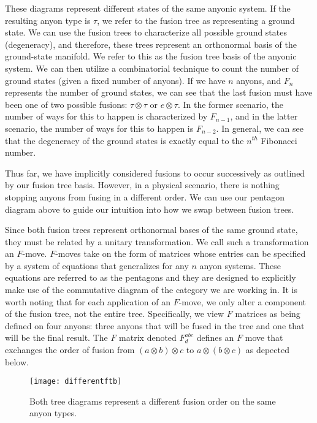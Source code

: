 These diagrams represent different states of the same anyonic system. If the resulting anyon type is $\tau$, we refer to the fusion tree as representing a ground state. We can use the fusion trees to characterize all possible ground states (degeneracy), and therefore, these trees represent an orthonormal basis of the ground-state manifold\cite{Trebst}. We refer to this as the fusion tree basis of the anyonic system. We can then utilize a combinatorial technique to count the number of ground states (given a fixed number of anyons). If we have $n$ anyons, and $F_n$ represents the number of ground states, we can see that the last fusion must have been one of two possible fusions: $\tau\otimes \tau$ or $e \otimes \tau$. In the former scenario, the number of ways for this to happen is characterized by $F_{n-1}$, and in the latter scenario, the number of ways for this to happen is $F_{n-2}$. In general, we can see that the degeneracy of the ground states is exactly equal to the $n^{th}$ Fibonacci number.

Thus far, we have implicitly considered fusions to occur successively as outlined by our fusion tree basis. However, in a physical scenario, there is nothing stopping anyons from fusing in a different order. We can use our pentagon diagram above to guide our intuition into how we swap between fusion trees.

Since both fusion trees represent orthonormal bases of the same ground state, they must be related by a unitary transformation. We call such a transformation an $F$-move. $F$-moves take on the form of matrices whose entries can be specified by a system of equations that generalizes for any $n$ anyon systems. These equations are referred to as the pentagons and they are designed to explicitly make use of the commutative diagram of the category we are working in. It is worth noting that for each application of an $F$-move, we only alter a component of the fusion tree, not the entire tree. Specifically, we view $F$ matrices as being defined on four anyons: three anyons that will be fused in the tree and one that will be the final result. The $F$ matrix denoted $F^{abc}_d$ defines an $F$ move that exchanges the order of fusion from $(a\otimes b)\otimes c$ to $a\otimes(b\otimes c)$ as depected below.

\begin{figure}[H]
	\centering
	\texttt{[image: differentftb]}
	\caption{Both tree diagrams represent a different fusion order on the same anyon types.}
\end{figure}

